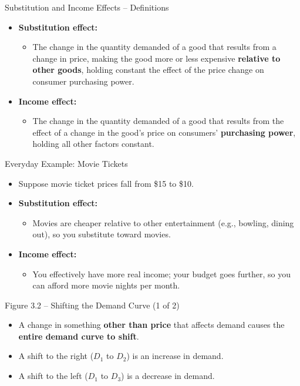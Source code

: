 \documentclass[aspectratio=169]{beamer}
\begin{document}
\begin{frame}{Substitution and Income Effects -- Definitions}
\transfade
\begin{itemize}[<+->]
  \item \textbf{Substitution effect:}
  \begin{itemize}[<+->]
    \item The change in the quantity demanded of a good that results from a change in price, making the good more or less expensive \textbf{relative to other goods}, holding constant the effect of the price change on consumer purchasing power.
  \end{itemize}
  \item \textbf{Income effect:}
  \begin{itemize}[<+->]
    \item The change in the quantity demanded of a good that results from the effect of a change in the good's price on consumers' \textbf{purchasing power}, holding all other factors constant.
  \end{itemize}
\end{itemize}
\end{frame}

\begin{frame}{Everyday Example: Movie Tickets}
\transfade
\small
\begin{itemize}[<+->]
  \item Suppose movie ticket prices fall from \$15 to \$10.
  \item \textbf{Substitution effect:}
  \begin{itemize}[<+->]
    \item Movies are cheaper relative to other entertainment (e.g., bowling, dining out), so you substitute toward movies.
  \end{itemize}
  \item \textbf{Income effect:}
  \begin{itemize}[<+->]
    \item You effectively have more real income; your budget goes further, so you can afford more movie nights per month.
  \end{itemize}
\end{itemize}
\end{frame}


\begin{frame}{Figure 3.2 -- Shifting the Demand Curve (1 of 2)}
\transfade
\begin{itemize}[<+->]
  \item A change in something \textbf{other than price} that affects demand causes the \textbf{entire demand curve to shift}.
  \item A shift to the right (\(D_1\) to \(D_2\)) is an \alert{increase in demand}.
  \item A shift to the left (\(D_1\) to \(D_3\)) is a \alert{decrease in demand}.
\end{itemize}
\end{frame}
\end{document}
